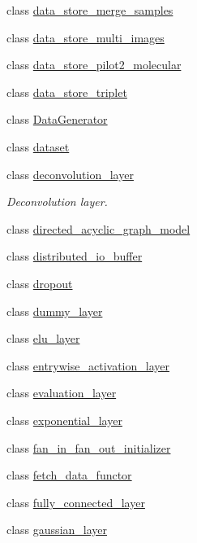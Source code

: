 \begin{DoxyCompactItemize}
class \hyperlink{classlbann_1_1data__store__merge__samples}{data\+\_\+store\+\_\+merge\+\_\+samples}
\item 
class \hyperlink{classlbann_1_1data__store__multi__images}{data\+\_\+store\+\_\+multi\+\_\+images}
\item 
class \hyperlink{classlbann_1_1data__store__pilot2__molecular}{data\+\_\+store\+\_\+pilot2\+\_\+molecular}
\item 
class \hyperlink{classlbann_1_1data__store__triplet}{data\+\_\+store\+\_\+triplet}
\item 
class \hyperlink{classlbann_1_1DataGenerator}{Data\+Generator}
\item 
class \hyperlink{classlbann_1_1dataset}{dataset}
\item 
class \hyperlink{classlbann_1_1deconvolution__layer}{deconvolution\+\_\+layer}
\begin{DoxyCompactList}\small\item\em Deconvolution layer. \end{DoxyCompactList}\item 
class \hyperlink{classlbann_1_1directed__acyclic__graph__model}{directed\+\_\+acyclic\+\_\+graph\+\_\+model}
\item 
class \hyperlink{classlbann_1_1distributed__io__buffer}{distributed\+\_\+io\+\_\+buffer}
\item 
class \hyperlink{classlbann_1_1dropout}{dropout}
\item 
class \hyperlink{classlbann_1_1dummy__layer}{dummy\+\_\+layer}
\item 
class \hyperlink{classlbann_1_1elu__layer}{elu\+\_\+layer}
\item 
class \hyperlink{classlbann_1_1entrywise__activation__layer}{entrywise\+\_\+activation\+\_\+layer}
\item 
class \hyperlink{classlbann_1_1evaluation__layer}{evaluation\+\_\+layer}
\item 
class \hyperlink{classlbann_1_1exponential__layer}{exponential\+\_\+layer}
\item 
class \hyperlink{classlbann_1_1fan__in__fan__out__initializer}{fan\+\_\+in\+\_\+fan\+\_\+out\+\_\+initializer}
\item 
class \hyperlink{classlbann_1_1fetch__data__functor}{fetch\+\_\+data\+\_\+functor}
\item 
class \hyperlink{classlbann_1_1fully__connected__layer}{fully\+\_\+connected\+\_\+layer}
\item 
class \hyperlink{classlbann_1_1gaussian__layer}{gaussian\+\_\+layer}
\item 

\end{DoxyCompactItemize}
